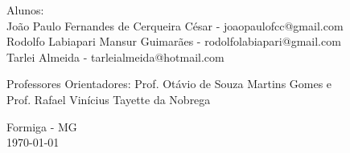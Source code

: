 \documentclass[portugues, brazil, a4paper,12pt]{article}
\begin{document}
\begin{titlepage}
  \vfill

  \begin{center}
    \begin{large}
      Alunos: \\
        João Paulo Fernandes de Cerqueira César - joaopaulofcc@gmail.com \\
		Rodolfo Labiapari Mansur Guimarães - rodolfolabiapari@gmail.com \\
		Tarlei Almeida - tarleialmeida@hotmail.com
    \end{large}
  \end{center}

\vfill

  \begin{center}
    \begin{large}
      Professores Orientadores: Prof. Otávio de Souza Martins Gomes e \\ Prof. Rafael Vinícius Tayette da Nobrega
    \end{large}
  \end{center}

\vfill

  \begin{center}
    \begin{large}
      Formiga - MG \\
      \today \\
    \end{large}
  \end{center}

\clearpage
\tableofcontents 
\end{titlepage}


\end{document}
